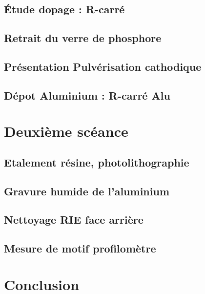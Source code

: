 \documentclass[11pt]{article}
\begin{document}
\subsection{\'Etude dopage : R-carr\'e}

\subsection{Retrait du verre de phosphore}

\subsection{Pr\'esentation Pulv\'erisation cathodique}

\subsection{D\'epot Aluminium : R-carr\'e Alu }

\section{Deuxi\`eme sc\'eance}

\subsection{Etalement r\'esine, photolithographie}

\subsection{Gravure humide de l'aluminium}

\subsection{Nettoyage RIE face arri\`ere}

\subsection{Mesure de motif profilom\`etre}
\fi

\clearpage

\section{Conclusion}
\end{document}
